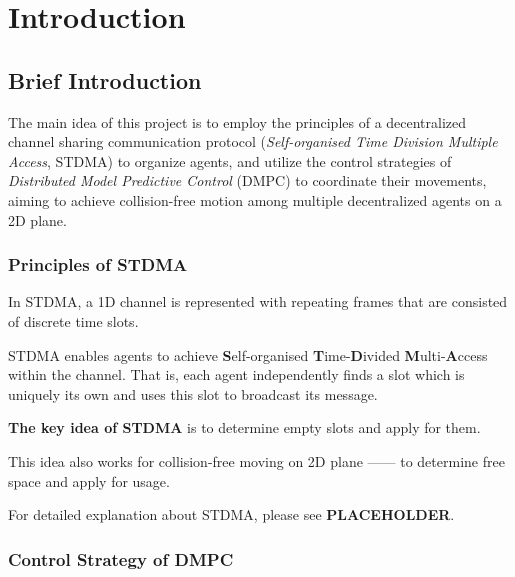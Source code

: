 \chapter{Introduction}
\label{chap:Introduction}

\section{Brief Introduction}
\label{chap:Brief Introduction}

The main idea of this project is to employ the principles of a decentralized channel sharing communication protocol (\textit{Self-organised Time Division Multiple Access}, STDMA\cite{STDMA}) to organize agents, and utilize the control strategies of \textit{Distributed Model Predictive Control} (DMPC) to coordinate their movements, aiming to achieve collision-free motion among multiple decentralized agents on a 2D plane.

\subsection{Principles of STDMA}


In STDMA, a 1D channel is represented with repeating frames that are consisted of discrete time slots.

STDMA enables agents to achieve \textbf{S}elf-organised \textbf{T}ime-\textbf{D}ivided \textbf{M}ulti-\textbf{A}ccess within the channel. That is, each agent independently finds a slot which is uniquely its own and uses this slot to broadcast its message.

\textbf{The key idea of STDMA} is to determine empty slots and apply for them.

This idea also works for collision-free moving on 2D plane —— to determine free space and apply for usage.

For detailed explanation about STDMA, please see \textbf{PLACEHOLDER}.

\subsection{Control Strategy of DMPC}


